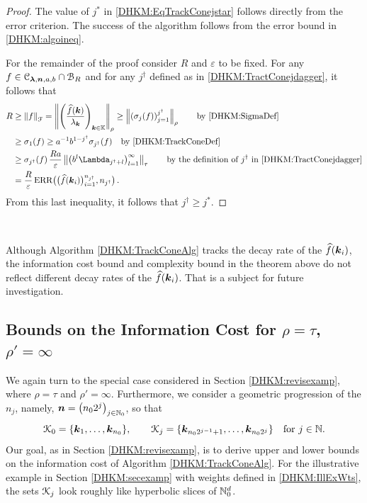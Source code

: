 \documentclass[USenglish]{article}
\theoremstyle{dgthm}
\theoremstyle{dgthm}
\theoremstyle{dgthm}
\theoremstyle{dgthm}
\theoremstyle{dgdef}
\theoremstyle{definition}
\DeclareMathOperator{\DHKMERR}{ERR}
\newcommand{\DHKMdataNjd}{\bigl(\DHKMhf(\bsk_i)\bigr)_{i=1}^{n_{j^\dagger}}}
\newcommand{\DHKMERRNjd}{\DHKMERR\bigl(\DHKMdataNjd,n_{j^\dagger}\bigr)}
\newcommand{\DHKMhf}{\widehat{f}}
\newcommand{\DHKMnorm}[2][{}]{\ensuremath{\left \lVert #2 \right \rVert}_{#1}}
\begin{document}
\begin{proof}
The value of $j^*$ in \eqref{DHKM:EqTrackConejstar} follows directly from the error criterion. The success of the algorithm follows from the error bound in \eqref{DHKM:algoineq}.

For the remainder of the proof consider $R$ and $\varepsilon$ to be fixed.  For any $f \in  {\mathcal{C}}_{\boldsymbol{\lambda},{\boldsymbol{n}},a,b} \cap {\mathcal{B}}_R$ and for any $j^\dagger$ defined  as in \eqref{DHKM:TractConejdagger}, it follows that
\begin{align*}
R &\ge \DHKMnorm[\calF]{f} = \DHKMnorm[\rho]{\left(\frac{\DHKMhf(\bsk)}{\lambda_{\bsk}} \right)_{\bsk \in \bbK}}
 \ge \DHKMnorm[\rho]{\left(\sigma_j(f)\right)_{j=1}^{j^\dagger}}  
 \qquad \text{by \eqref{DHKM:SigmaDef} } \\
& \ge \sigma_1(f) \ge a^{-1}b^{1-j^\dagger}\sigma_{j^\dagger}(f) \quad \text{by  \eqref{DHKM:TrackConeDef}}\\
& \ge \sigma_{j^\dagger}(f)\,\frac{Ra}{\varepsilon} \DHKMnorm[\tau]{ \bigl(b^l \Lambda_{j^\dagger+l} \bigr)_{l=1}^\infty}
\qquad \text{by the definition of } j^\dagger \text{ in \eqref{DHKM:TractConejdagger}} \\
& = \frac{R}{\varepsilon} \DHKMERRNjd\, .
\end{align*}
From this last inequality, it follows that $j^\dagger \ge j^*$.
\end{proof} \

Although Algorithm \ref{DHKM:TrackConeAlg} tracks the decay rate of the $\DHKMhf(\bsk_i)$, the information cost bound and complexity bound in the theorem above do not reflect different decay rates of the $\DHKMhf(\bsk_i)$. That is a subject for future investigation.  

\subsection{Bounds on the Information Cost for $\rho = \tau$, $\rho' = \infty$}\label{DHKM:SecDecayRhoEqTau}
We again turn to the special case considered in Section \ref{DHKM:revisexamp}, where $\rho = \tau$ and $\rho' = \infty$.  Furthermore, we consider a geometric progression of the $n_j$, namely, ${\boldsymbol{n}} = \bigl (n_02^j \bigr)_{j \in {\mathbb{N}}_0}$, so that
\[
{\mathcal{K}}_0 = \{{\boldsymbol{k}}_{1}, \ldots, {\boldsymbol{k}}_{n_0}\}, \qquad {\mathcal{K}}_j = \{{\boldsymbol{k}}_{n_0 2^{j-1}+1}, \ldots, {\boldsymbol{k}}_{n_02^j}\} \quad \text{for } j \in {\mathbb{N}}.
\]
Our goal, as in Section \ref{DHKM:revisexamp}, is to derive upper and lower bounds on the information cost of Algorithm \ref{DHKM:TrackConeAlg}. For the illustrative example in Section \ref{DHKM:secexamp} with weights defined in \eqref{DHKM:IllExWts}, the sets ${\mathcal{K}}_j$ look roughly like hyperbolic slices of ${\mathbb{N}}_0^d$.
\end{document}
